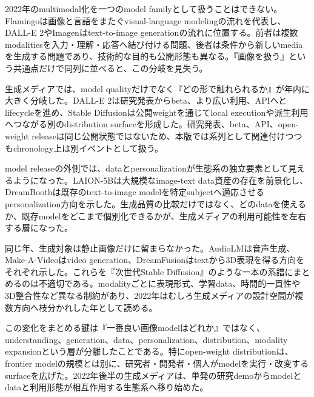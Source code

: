 
2022年のmultimodal化を一つのmodel familyとして扱うことはできない。Flamingoは画像と言語をまたぐvisual-language modelingの流れを代表し、DALL-E 2やImagenはtext-to-image generationの流れに位置する。前者は複数modalitiesを入力・理解・応答へ結び付ける問題、後者は条件から新しいmediaを生成する問題であり、技術的な目的も公開形態も異なる。『画像を扱う』という共通点だけで同列に並べると、この分岐を見失う。\autocite{src-13aed13ff36c,src-16a1a1dc486e,src-27297a80fac0,src-2c38d2f354fa,src-86ce6205a4ed,src-929080260e16,src-c5c7eddb6cf6,src-cf669aed6653}


生成メディアでは、model qualityだけでなく『どの形で触れられるか』が年内に大きく分岐した。DALL-E 2は研究発表からbeta、より広い利用、APIへとlifecycleを進め、Stable Diffusionは公開weightを通じてlocal executionや派生利用へつながる別のdistribution surfaceを形成した。研究発表、beta、API、open-weight releaseは同じ公開状態ではないため、本版では系列として関連付けつつもchronology上は別イベントとして扱う。\autocite{src-16a1a1dc486e,src-26aadbc0393f,src-27297a80fac0,src-2832ee43ab8f,src-2c38d2f354fa,src-86ce6205a4ed,src-929080260e16}


model releaseの外側では、dataとpersonalizationが生態系の独立要素として見えるようになった。LAION-5Bは大規模なimage-text data資産の存在を前景化し、DreamBoothは既存のtext-to-image modelを特定subjectへ適応させるpersonalization方向を示した。生成品質の比較だけではなく、どのdataを使えるか、既存modelをどこまで個別化できるかが、生成メディアの利用可能性を左右する層になった。\autocite{src-26aadbc0393f,src-2832ee43ab8f,src-76875f66d5f3,src-e0a494dc6724}


同じ年、生成対象は静止画像だけに留まらなかった。AudioLMは音声生成、Make-A-Videoはvideo generation、DreamFusionはtextから3D表現を得る方向をそれぞれ示した。これらを『次世代Stable Diffusion』のような一本の系譜にまとめるのは不適切である。modalityごとに表現形式、学習data、時間的一貫性や3D整合性など異なる制約があり、2022年はむしろ生成メディアの設計空間が複数方向へ枝分かれした年として読める。\autocite{src-1b692f6d18b5,src-b2dbb3098853,src-c19139f0be76}


この変化をまとめる鍵は『一番良い画像modelはどれか』ではなく、understanding、generation、data、personalization、distribution、modality expansionという層が分離したことである。特にopen-weight distributionは、frontier modelの規模とは別に、研究者・開発者・個人がmodelを実行・改変するsurfaceを広げた。2022年後半の生成メディアは、単発の研究demoからmodelとdataと利用形態が相互作用する生態系へ移り始めた。\autocite{src-13aed13ff36c,src-16a1a1dc486e,src-1b692f6d18b5,src-26aadbc0393f,src-27297a80fac0,src-2832ee43ab8f,src-2c38d2f354fa,src-76875f66d5f3,src-86ce6205a4ed,src-929080260e16,src-b2dbb3098853,src-c19139f0be76,src-c5c7eddb6cf6,src-cf669aed6653,src-e0a494dc6724}


